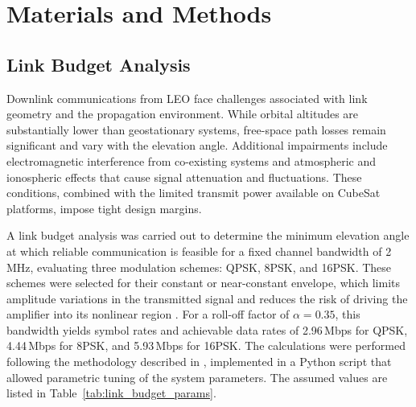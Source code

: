 \section{Materials and Methods}
\subsection{Link Budget Analysis} \label{sec:link_budget}
Downlink communications from LEO face challenges associated with link geometry and the propagation environment. While orbital altitudes are substantially lower than geostationary systems, free-space path losses remain significant and vary with the elevation angle. Additional impairments include electromagnetic interference from co-existing systems and atmospheric and ionospheric effects that cause signal attenuation and fluctuations. These conditions, combined with the limited transmit power available on CubeSat platforms, impose tight design margins.

A link budget analysis was carried out to determine the minimum elevation angle at which reliable communication is feasible for a fixed channel bandwidth of 2\,MHz, evaluating three modulation schemes: QPSK, 8PSK, and 16PSK. These schemes were selected for their constant or near-constant envelope, which limits amplitude variations in the transmitted signal and reduces the risk of driving the amplifier into its nonlinear region \cite{Cripps2006}. For a roll-off factor of $\alpha = 0.35$, this bandwidth yields symbol rates and achievable data rates of 2.96\,Mbps for QPSK, 4.44\,Mbps for 8PSK, and 5.93\,Mbps for 16PSK. The calculations were performed following the methodology described in \cite{Seybold2005}, implemented in a Python script that allowed parametric tuning of the system parameters. The assumed values are listed in Table~\ref{tab:link_budget_params}.

